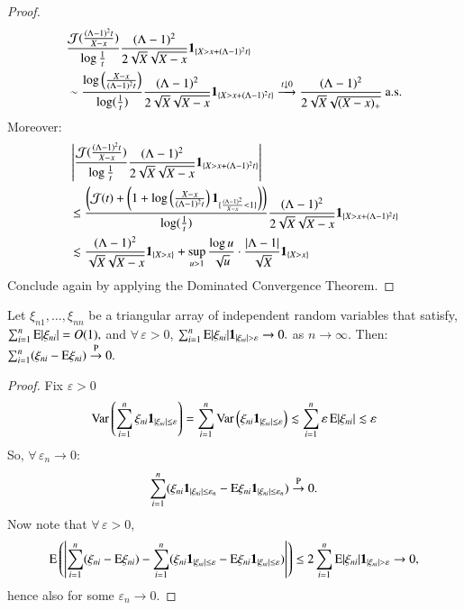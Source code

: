 \begin{proof}
			\begin{align*}
				&\frac{\mathcal{J}(\frac{(\Lambda-1)^2 t}{X-x})}{\log \frac{1}{t}} \frac{(\Lambda-1)^2}{2\sqrt{X}\sqrt{X-x}} \mathbf{1}_{\{X > x + (\Lambda-1)^2 t\}} \\
				&\sim \frac{\log\left( \frac{X-x}{(\Lambda-1)^2 t} \right)}{\log(\frac{1}{t})} \frac{(\Lambda-1)^2}{2\sqrt{X}\sqrt{X-x}} \mathbf{1}_{\{X > x + (\Lambda-1)^2 t\}} \overset{t \downarrow 0}{\longrightarrow} \frac{(\Lambda-1)^2}{2\sqrt{X}\sqrt{(X-x)_+}} \: \text{a.s.}
			\end{align*}
			Moreover:
			\begin{align*}
				&\left| \frac{\mathcal{J}(\frac{(\Lambda-1)^2 t}{X-x})}{\log \frac{1}{t}} \frac{(\Lambda-1)^2}{2\sqrt{X}\sqrt{X-x}} \mathbf{1}_{\{X > x + (\Lambda-1)^2 t\}} \right| \\
				&\leq \frac{\left( \mathcal{J}(t) + \left(1 + \log\left(\frac{X-x}{(\Lambda-1)^2 t}\right) \mathbf{1}_{\{\frac{(\Lambda-1)^2}{X-x} < 1\}}\right)\right)}{\log(\frac{1}{t})} \frac{(\Lambda-1)^2}{2\sqrt{X}\sqrt{X-x}} \mathbf{1}_{\{X > x + (\Lambda-1)^2 t\}} \\
				&\lesssim \frac{(\Lambda-1)^2}{\sqrt{X}\sqrt{X-x}} \mathbf{1}_{\{X>x\}} + \sup_{u>1} \frac{\log u}{\sqrt{u}} \cdot \frac{|\Lambda-1|}{\sqrt{X}} \mathbf{1}_{\{X>x\}}
			\end{align*}
			Conclude again by applying the Dominated Convergence Theorem.
		\end{proof}

        \begin{lemma}\label{supp:lemma: third convergence}
			Let $\xi_{n1}, \dots, \xi_{nn}$ be a triangular array of independent random variables that satisfy,
			\(
			\sum_{i=1}^{n} \mathrm{E}|\xi_{ni}| = O(1) , \) and $\forall \, \varepsilon > 0 $, \( \sum_{i=1}^{n} \mathrm{E}|\xi_{ni}| \mathbf{1}_{|\xi_{ni}| > \varepsilon} \to 0.
			\) as $n \rightarrow \infty$.
			Then:
			\(
			\sum_{i=1}^{n} (\xi_{ni} - \mathrm{E} \xi_{ni}) \overset{\mathrm{P}}{\to} 0.
			\)
		\end{lemma}
		\begin{proof}
			Fix $\varepsilon >0$
			\[
			\text{Var} \left( \sum_{i=1}^{n} \xi_{ni} \mathbf{1}_{|\xi_{ni}| \le \varepsilon} \right) = \sum_{i=1}^{n} \text{Var} \left( \xi_{ni} \mathbf{1}_{|\xi_{ni}| \le \varepsilon} \right) \lesssim \sum_{i=1}^{n} \varepsilon \, \mathrm{E}|\xi_{ni}|  \lesssim \varepsilon
			\]
			So, $\forall \, \varepsilon_n \to 0$:
			\[
			\sum_{i=1}^{n} (\xi_{ni} \mathbf{1}_{|\xi_{ni}| \le \varepsilon_n} - \mathrm{E} \xi_{ni} \mathbf{1}_{|\xi_{ni}| \le \varepsilon_n}) \overset{\mathrm{P}}{\to} 0.
			\]
			Now note that $\forall \, \varepsilon > 0$,
			\[
			\mathrm{E} \left( \left|\sum_{i=1}^{n} (\xi_{ni} - \mathrm{E} \xi_{ni}) - \sum_{i=1}^{n} (\xi_{ni} \mathbf{1}_{|\xi_{ni}| \le \varepsilon} - \mathrm{E} \xi_{ni} \mathbf{1}_{|\xi_{ni}| \le \varepsilon}) \right| \right) \le 2 \sum_{i=1}^{n} \mathrm{E} |\xi_{ni}| \mathbf{1}_{|\xi_{ni}| > \varepsilon} \to 0,
			\]
			hence also for some $\varepsilon_n \to 0$. 
		\end{proof}

